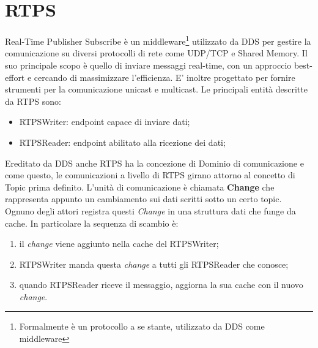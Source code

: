 \section{RTPS}
Real-Time Publisher Subscribe è un middleware\footnote{Formalmente è un protocollo a se stante, utilizzato da DDS come middleware} utilizzato da DDS per gestire la comunicazione su diversi protocolli di rete come UDP/TCP e Shared Memory. Il suo principale scopo è quello di inviare messaggi real-time, con un approccio best-effort e cercando di massimizzare l'efficienza. E' inoltre progettato per fornire strumenti per la comunicazione unicast e multicast. Le principali entità descritte da RTPS sono:
\begin{itemize}
    \item RTPSWriter: endpoint capace di inviare dati;
    \item RTPSReader: endpoint abilitato alla ricezione dei dati;
\end{itemize}
Ereditato da DDS anche RTPS ha la concezione di Dominio di comunicazione e come questo, le comunicazioni a livello di RTPS girano attorno al concetto di Topic prima definito. L'unità di comunicazione è chiamata \textbf{Change} che rappresenta appunto un cambiamento sui dati scritti sotto un certo topic. Ognuno degli attori registra questi \emph{Change} in una struttura dati che funge da cache.
In particolare la sequenza di scambio è:
\begin{enumerate}
    \item il \emph{change} viene aggiunto nella cache del RTPSWriter;
    \item RTPSWriter manda questa \emph{change} a tutti gli RTPSReader che conosce;
    \item quando RTPSReader riceve il messaggio, aggiorna la sua cache con il nuovo \emph{change}.
\end{enumerate}

